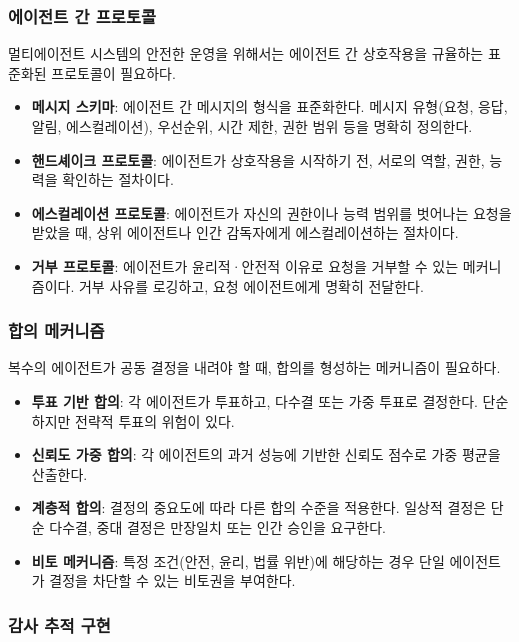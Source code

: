 \subsubsection{에이전트 간 프로토콜}

멀티에이전트 시스템의 안전한 운영을 위해서는 에이전트 간 상호작용을 규율하는 표준\cite{cihon2019standards}화된 프로토콜이 필요하다.

\begin{itemize}
 \item \textbf{메시지 스키마}: 에이전트 간 메시지의 형식을 표준화한다. 메시지 유형(요청, 응답, 알림, 에스컬레이션), 우선순위, 시간 제한, 권한 범위 등을 명확히 정의한다.
 \item \textbf{핸드셰이크 프로토콜}: 에이전트가 상호작용을 시작하기 전, 서로의 역할, 권한, 능력을 확인하는 절차이다.
 \item \textbf{에스컬레이션 프로토콜}: 에이전트가 자신의 권한이나 능력 범위를 벗어나는 요청을 받았을 때, 상위 에이전트나 인간 감독자에게 에스컬레이션하는 절차이다.
 \item \textbf{거부 프로토콜}: 에이전트가 윤리적·안전적 이유로 요청을 거부할 수 있는 메커니즘이다. 거부 사유를 로깅하고, 요청 에이전트에게 명확히 전달한다.
\end{itemize}

\subsubsection{합의 메커니즘}

복수의 에이전트가 공동 결정을 내려야 할 때, 합의를 형성하는 메커니즘이 필요하다.

\begin{itemize}
 \item \textbf{투표 기반 합의}: 각 에이전트가 투표하고, 다수결 또는 가중 투표로 결정한다. 단순하지만 전략적 투표의 위험이 있다.
 \item \textbf{신뢰도 가중 합의}: 각 에이전트의 과거 성능에 기반한 신뢰도 점수로 가중 평균을 산출한다.
 \item \textbf{계층적 합의}: 결정의 중요도에 따라 다른 합의 수준을 적용한다. 일상적 결정은 단순 다수결, 중대 결정은 만장일치 또는 인간 승인을 요구한다.
 \item \textbf{비토 메커니즘}: 특정 조건(안전, 윤리, 법률 위반)에 해당하는 경우 단일 에이전트가 결정을 차단할 수 있는 비토권을 부여한다.
\end{itemize}

\subsubsection{감사 추적 구현}

